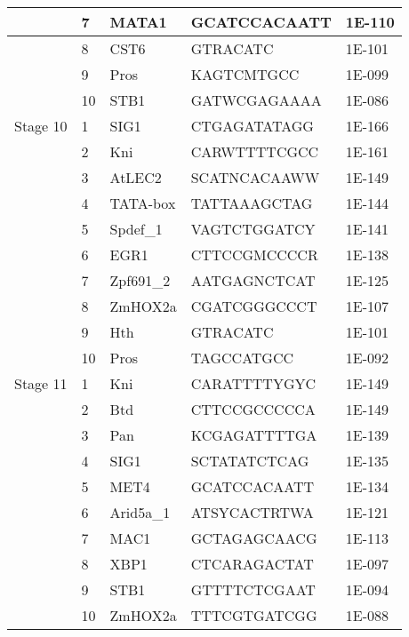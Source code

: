 \begin{center}
\begin{longtable}{|l|l|l|l|l|}
         & 7    & MATA1         & GCATCCACAATT       & 1E-110  \\ \hline
         & 8    & CST6          & GTRACATC           & 1E-101  \\ \hline
         & 9    & Pros          & KAGTCMTGCC         & 1E-099  \\ \hline
         & 10   & STB1          & GATWCGAGAAAA       & 1E-086  \\ \hline
Stage 10 & 1    & SIG1          & CTGAGATATAGG       & 1E-166  \\ \hline
         & 2    & Kni           & CARWTTTTCGCC       & 1E-161  \\ \hline
         & 3    & AtLEC2        & SCATNCACAAWW       & 1E-149  \\ \hline
         & 4    & TATA-box      & TATTAAAGCTAG       & 1E-144  \\ \hline
         & 5    & Spdef\_1      & VAGTCTGGATCY       & 1E-141  \\ \hline
         & 6    & EGR1          & CTTCCGMCCCCR       & 1E-138  \\ \hline
         & 7    & Zpf691\_2     & AATGAGNCTCAT       & 1E-125  \\ \hline
         & 8    & ZmHOX2a       & CGATCGGGCCCT       & 1E-107  \\ \hline
         & 9    & Hth           & GTRACATC           & 1E-101  \\ \hline
         & 10   & Pros          & TAGCCATGCC         & 1E-092  \\ \hline
Stage 11 & 1    & Kni           & CARATTTTYGYC       & 1E-149  \\ \hline
         & 2    & Btd           & CTTCCGCCCCCA       & 1E-149  \\ \hline
         & 3    & Pan           & KCGAGATTTTGA       & 1E-139  \\ \hline
         & 4    & SIG1          & SCTATATCTCAG       & 1E-135  \\ \hline
         & 5    & MET4          & GCATCCACAATT       & 1E-134  \\ \hline
         & 6    & Arid5a\_1     & ATSYCACTRTWA       & 1E-121  \\ \hline
         & 7    & MAC1          & GCTAGAGCAACG       & 1E-113  \\ \hline
         & 8    & XBP1          & CTCARAGACTAT       & 1E-097  \\ \hline
         & 9    & STB1          & GTTTTCTCGAAT       & 1E-094  \\ \hline
         & 10   & ZmHOX2a       & TTTCGTGATCGG       & 1E-088  \\ \hline

\end{longtable}
\end{center}
